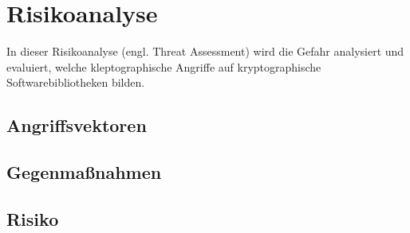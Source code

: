 \chapter{Risikoanalyse}
    In dieser Risikoanalyse (engl. Threat Assessment) wird die Gefahr analysiert und evaluiert, welche kleptographische Angriffe auf kryptographische Softwarebibliotheken bilden.

    \section{Angriffsvektoren}

    \section{Gegenmaßnahmen}

    \section{Risiko}
